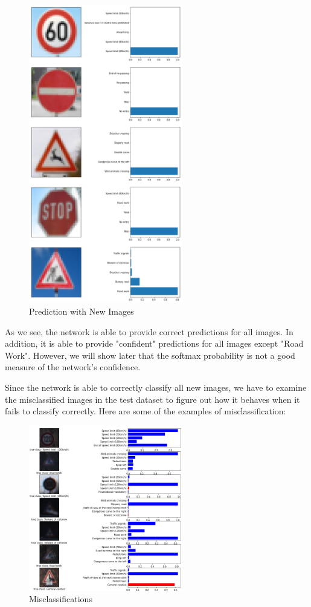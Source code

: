 \documentclass[]{article}
\begin{document}
\begin{figure}[H]
	\centering
	\includegraphics[width=0.6\textwidth]{newpred}
	\caption{Prediction with New Images}
	\label{fig:newpred}
\end{figure}

As we see, the network is able to provide correct predictions for all images. In addition, it is able to provide "confident" predictions for all images except "Road Work". However, we will show later that the softmax probability is not a good measure of the network's confidence.

Since the network is able to correctly classify all new images, we have to examine the misclassified images in the test dataset to figure out how it behaves when it fails to classify correctly. Here are some of the examples of misclassification:

\begin{figure}[H]
	\centering
	\includegraphics[width=0.6\textwidth]{wrong_small}
	\caption{Misclassifications}
	\label{fig:mis}
\end{figure}
\end{document}
